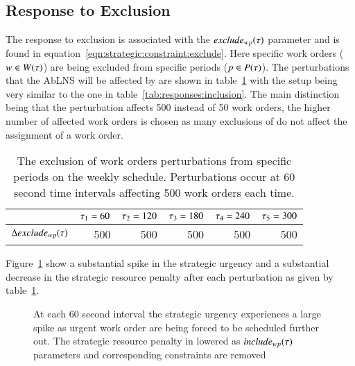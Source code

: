 \subsection{Response to Exclusion}\label{sec:exclusion}
The response to exclusion is associated with the $exclude_{wp}(\tau)$
parameter and is found in equation~\ref{eqn:strategic:constraint:exclude}.
Here specific work orders ($w \in W(\tau)$) are
being excluded from specific periods ($p \in P(\tau)$).
The perturbations that the AbLNS will be affected by are shown in
table~\ref{tab:responses:exclusion}
with the setup being very similar to the
one in table~\ref{tab:responses:inclusion}.
The main distinction being that the perturbation affects 500 instead of 50 work orders, the higher number 
of affected work orders is chosen as many exclusions of do not affect the assignment of a work order.

\begin{table}[H]
	\centering
	\begin{tabular}{lrrrrr}
	\toprule
	                                & $\tau_1 = 60$ & $\tau_2 = 120$ & $\tau_3 = 180$ & $\tau_4 = 240$ & $\tau_5 = 300$ \\ \midrule
	$\Delta exclude_{wp}(\tau)$ & 500                   & 500                    & 500                    & 500                    & 500                    \\ \bottomrule
	\end{tabular}
	\caption{The exclusion of work orders perturbations from specific periods on the weekly schedule. 
		Perturbations occur at 60 second time intervals affecting 500 work orders each time.
	}\label{tab:responses:exclusion}
\end{table}

Figure~\ref{fig:responses:exclusion}  show a substantial spike in the strategic urgency
and a substantial decrease in the strategic resource penalty   
after each perturbation as given by table~\ref{tab:responses:exclusion}. 

\begin{figure}[H]
	\centering
	\resizebox{10cm}{!}{
		
	}
	\caption{At each 60 second interval the strategic urgency experiences a 
		large spike as urgent work order are being forced to be scheduled further out.
		The strategic resource penalty in lowered as $include_{wp}(\tau)$ parameters
		and corresponding constraints are removed 
	}\label{fig:responses:exclusion}
\end{figure}

